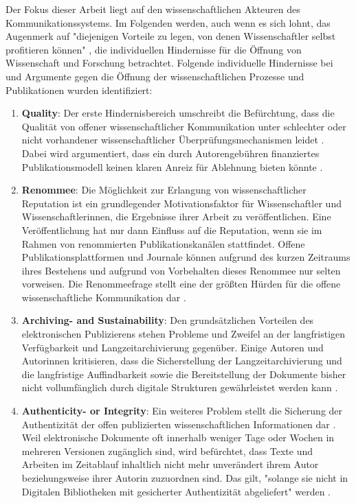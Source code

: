 Der Fokus dieser Arbeit liegt auf den wissenschaftlichen Akteuren des Kommunikationssystems. Im Folgenden werden, auch wenn es sich lohnt, das Augenmerk auf "diejenigen Vorteile zu legen, von denen Wissenschaftler selbst profitieren können" \cite{Mueller_2010}, die individuellen Hindernisse für die Öffnung von Wissenschaft und Forschung betrachtet. Folgende individuelle Hindernisse bei und Argumente gegen die Öffnung der wissenschaftlichen Prozesse und Publikationen wurden identifiziert:
\begin{enumerate}
\item \textbf{Quality}: Der erste Hindernisbereich umschreibt die Befürchtung, dass die Qualität von offener wissenschaftlicher Kommunikation unter schlechter oder nicht vorhandener wissenschaftlicher Überprüfungsmechanismen leidet \cite{Chibnik_2015} \cite{Beall_2012}. Dabei wird argumentiert, dass ein durch Autorengebühren finanziertes Publikationsmodell keinen klaren Anreiz für Ablehnung bieten könnte \cite[:257]{Jubb_2011}.
\item \textbf{Renommee}: Die Möglichkeit zur Erlangung von wissenschaftlicher Reputation ist ein grundlegender Motivationsfaktor für Wissenschaftler und Wissenschaftlerinnen, die Ergebnisse ihrer Arbeit zu veröffentlichen. Eine Veröffentlichung hat nur dann Einfluss auf die Reputation, wenn sie im Rahmen von renommierten Publikationskanälen stattfindet. Offene Publikationsplattformen und Journale können aufgrund des kurzen Zeitraums ihres Bestehens und aufgrund von Vorbehalten dieses Renommee nur selten vorweisen. Die Renommeefrage stellt eine der größten Hürden für die offene wissenschaftliche Kommunikation dar \cite{Weishaupt_2009} \cite{Woelfle_2011}.
\item \textbf{Archiving- and Sustainability}: Den grundsätzlichen Vorteilen des elektronischen Publizierens stehen Probleme und Zweifel an der langfristigen Verfügbarkeit und Langzeitarchivierung \cite{Weishaupt_2009} gegenüber. Einige Autoren und Autorinnen kritisieren, dass die Sicherstellung der Langzeitarchivierung und die langfristige Auffindbarkeit sowie die Bereitstellung der Dokumente bisher nicht vollumfänglich durch digitale Strukturen gewährleistet werden kann \cite{Umstaetter_2007} \cite{Gersmann_2007}.
\item \textbf{Authenticity- or Integrity}: Ein weiteres Problem stellt die Sicherung der Authentizität der offen publizierten wissenschaftlichen Informationen dar \cite{Umstaetter_2007} \cite{Weishaupt_2009} \cite{Grand_2012}. Weil elektronische Dokumente oft innerhalb weniger Tage oder Wochen in mehreren Versionen zugänglich sind, wird befürchtet, dass Texte und Arbeiten im Zeitablauf inhaltlich nicht mehr unverändert ihrem Autor beziehungsweise ihrer Autorin zuzuordnen sind. Das gilt, "solange sie nicht in Digitalen Bibliotheken mit gesicherter Authentizität abgeliefert" werden \cite{Umstaetter_2007}.

\end{enumerate}

